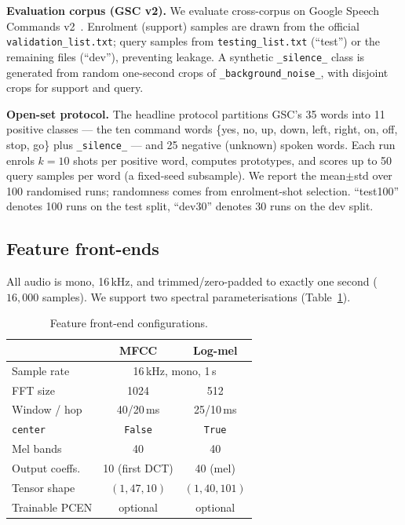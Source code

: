 \documentclass[12pt,a4paper]{article}
\newcommand{\code}[1]{\texttt{\small #1}}
\begin{document}
\textbf{Evaluation corpus (GSC v2).} We evaluate cross-corpus on Google Speech
Commands v2~\cite{warden2018speech}. Enrolment (support) samples are drawn from
the official \code{validation\_list.txt}; query samples from
\code{testing\_list.txt} (``test'') or the remaining files (``dev''), preventing
leakage. A synthetic \code{\_silence\_} class is generated from random one-second
crops of \code{\_background\_noise\_}, with disjoint crops for support and query.

\textbf{Open-set protocol.} The headline protocol partitions GSC's 35 words into
11 positive classes --- the ten command words \{yes, no, up, down, left, right,
on, off, stop, go\} plus \code{\_silence\_} --- and 25 negative (unknown) spoken
words. Each run enrols $k{=}10$ shots per positive word, computes prototypes, and
scores up to 50 query samples per word (a fixed-seed subsample). We report the
mean$\pm$std over 100 randomised runs; randomness comes from enrolment-shot
selection. ``test100'' denotes 100 runs on the test split, ``dev30'' denotes 30
runs on the dev split.

\subsection{Feature front-ends}\label{sec:frontends}

All audio is mono, 16\,kHz, and trimmed/zero-padded to exactly one second
($16{,}000$ samples). We support two spectral parameterisations
(Table~\ref{tab:features}).

\begin{table}[t]
\centering
\caption{Feature front-end configurations.}
\label{tab:features}
\begin{tabular}{lcc}
\toprule
 & \textbf{MFCC} & \textbf{Log-mel} \\
\midrule
Sample rate     & \multicolumn{2}{c}{16\,kHz, mono, 1\,s} \\
FFT size        & 1024  & 512  \\
Window / hop    & 40/20\,ms & 25/10\,ms \\
\code{center}   & \code{False} & \code{True} \\
Mel bands       & 40 & 40 \\
Output coeffs.  & 10 (first DCT) & 40 (mel) \\
Tensor shape    & $(1,47,10)$ & $(1,40,101)$ \\
Trainable PCEN  & optional & optional \\
\bottomrule
\end{tabular}
\end{table}
\end{document}
